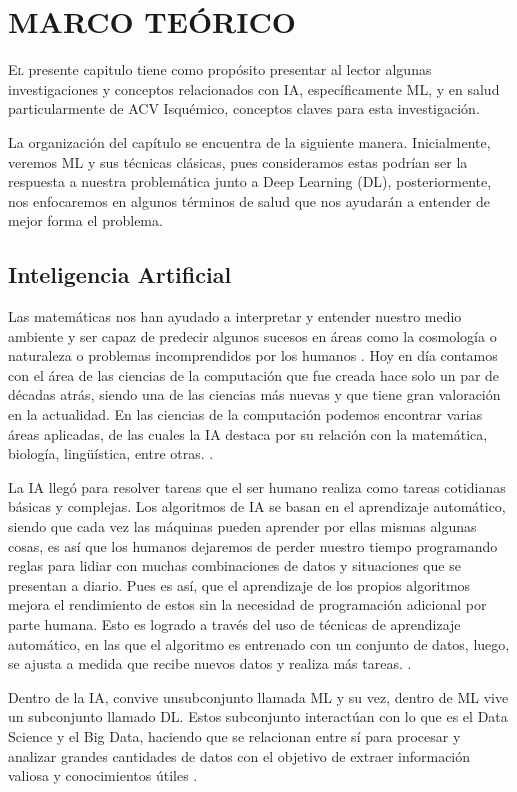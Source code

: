 \doublespacing
\chapter{MARCO TEÓRICO}
\label{sec:marco teorico}
\lettrine[lines=4, slope=0.2em, findent=0.2em, nindent=0.6em]{E}l presente capitulo tiene como propósito presentar al lector algunas investigaciones y conceptos relacionados con IA, específicamente ML, y en salud particularmente de ACV Isquémico, conceptos claves para esta investigación. \\
\par La organización del capítulo se encuentra de la siguiente manera. Inicialmente, veremos ML y sus técnicas clásicas, pues consideramos estas podrían ser la respuesta a nuestra problemática junto a Deep Learning (DL), posteriormente, nos enfocaremos en algunos términos de salud que nos ayudarán a entender de mejor forma el problema. 
\\

\doublespacing
\section{Inteligencia Artificial}
Las matemáticas nos han ayudado a interpretar y entender nuestro medio ambiente y ser capaz de predecir algunos sucesos en áreas como la cosmología o naturaleza o problemas incomprendidos por los humanos \cite{Grazia2022}. Hoy en día contamos con el área de las ciencias de la computación que fue creada hace solo un par de décadas atrás, siendo una de las ciencias más nuevas y que tiene gran valoración en la actualidad. En las ciencias de la computación podemos encontrar varias áreas aplicadas, de las cuales la IA destaca por su relación con la matemática, biología, lingüística, entre otras. \cite{Grazia2022}.\\
\par La IA llegó para resolver tareas que el ser humano realiza como tareas cotidianas básicas y complejas. Los algoritmos de IA se basan en el aprendizaje automático, siendo que cada vez las máquinas pueden aprender por ellas mismas algunas cosas, es así que los humanos dejaremos de perder nuestro tiempo programando reglas para lidiar con muchas combinaciones de datos y situaciones que se presentan a diario. Pues es así, que el aprendizaje de los propios algoritmos mejora el rendimiento de estos sin la necesidad de programación adicional por parte humana. Esto es logrado a través del uso de técnicas de aprendizaje automático, en las que el algoritmo es entrenado con un conjunto de datos, luego, se ajusta a medida que recibe nuevos datos y realiza más tareas. \cite{Carola}.\\
\par Dentro de la IA, convive unsubconjunto llamada ML y su vez, dentro de ML vive un subconjunto llamado DL. Estos subconjunto interactúan con lo que es el Data Science y el Big Data, haciendo que se relacionan entre sí para procesar y analizar grandes cantidades de datos con el objetivo de extraer información valiosa y conocimientos útiles \cite{moreno2021diseno}.\\

